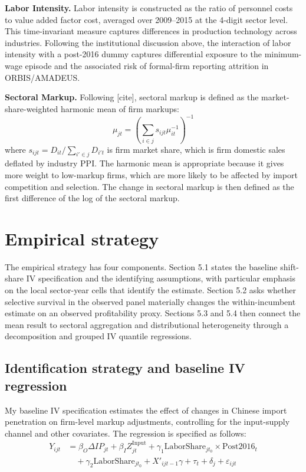 \documentclass[12pt]{article}
\newcommand{\textcite}[2][]{[cite]}
\begin{document}
\textbf{Labor Intensity.} Labor intensity is constructed as the ratio of personnel costs to value added factor cost, averaged over 2009--2015 at the 4-digit sector level. This time-invariant measure captures differences in production technology across industries. Following the institutional discussion above, the interaction of labor intensity with a post-2016 dummy captures differential exposure to the minimum-wage episode and the associated risk of formal-firm reporting attrition in ORBIS/AMADEUS.

\textbf{Sectoral Markup.} Following \textcite{bursteinBottomUpMarkupFluctuations2025}, sectoral markup is defined as the market-share-weighted harmonic mean of firm markups:
\[
\mu_{jt} = \left( \sum_{i \in j} s_{ijt} \mu_{it}^{-1} \right)^{-1}
\]
where $s_{ijt} = D_{it}/\sum_{i' \in j} D_{i't}$ is firm market share, which is firm domestic sales deflated by industry PPI. The harmonic mean is appropriate because it gives more weight to low-markup firms, which are more likely to be affected by import competition and selection. The change in sectoral markup is then defined as the first difference of the log of the sectoral markup.


\section{Empirical strategy}
\label{sec:empirical_strategy}
The empirical strategy has four components. Section 5.1 states the baseline shift-share IV specification and the identifying assumptions, with particular emphasis on the local sector-year cells that identify the estimate. Section 5.2 asks whether selective survival in the observed panel materially changes the within-incumbent estimate on an observed profitability proxy. Sections 5.3 and 5.4 then connect the mean result to sectoral aggregation and distributional heterogeneity through a decomposition and grouped IV quantile regressions.

\subsection{Identification strategy and baseline IV regression}
\label{sec:empirical_strategy_iv}

My baseline IV specification estimates the effect of changes in Chinese import penetration on firm-level markup adjustments, controlling for the input-supply channel and other covariates. The regression is specified as follows:
\begin{equation}
\begin{aligned}
Y_{ijt} &= \beta_O \Delta IP_{jt} + \beta_I Z_{jt}^{\text{Input}} + \gamma_1 \text{LaborShare}_{jt_0} \times \text{Post2016}_t \\
&\quad + \gamma_2 \text{LaborShare}_{jt_0} + X'_{ijt-1} \gamma + \tau_t + \delta_j + \varepsilon_{ijt}
\end{aligned}
\end{equation}
\end{document}
